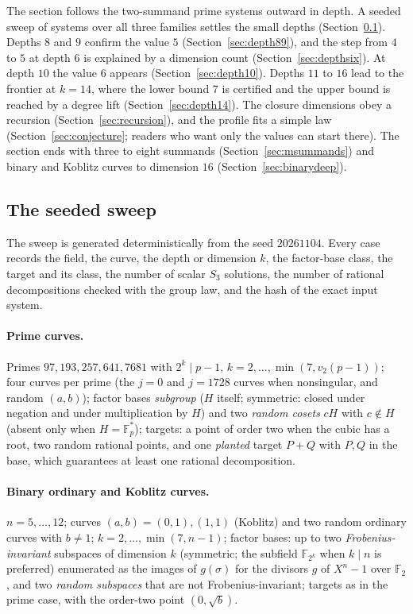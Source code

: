 \documentclass[11pt]{article}
\theoremstyle{definition}\newtheorem{definition}[theorem]{Definition}
\theoremstyle{remark}\newtheorem{remark}[theorem]{Remark}
\newcommand{\F}{\mathbb F}
\begin{document}
The section follows the two-summand prime systems outward in depth. A seeded
sweep of \SWEEPSYSTEMS{} systems over all three families settles the small
depths (Section~\ref{sec:sweep}). Depths $8$ and $9$ confirm the value $5$
(Section~\ref{sec:depth89}), and the step from $4$ to $5$ at depth $6$ is
explained by a dimension count (Section~\ref{sec:depthsix}). At depth $10$
the value $6$ appears (Section~\ref{sec:depth10}). Depths $11$ to $16$ lead
to the frontier at $k=14$, where the lower bound $7$ is certified and the
upper bound is reached by a degree lift (Section~\ref{sec:depth14}). The
closure dimensions obey a recursion (Section~\ref{sec:recursion}), and the
profile fits a simple law (Section~\ref{sec:conjecture}; readers who want
only the values can start there). The section ends with three to eight
summands (Section~\ref{sec:msummands}) and binary and Koblitz curves to
dimension $16$ (Section~\ref{sec:binarydeep}).

\subsection{The seeded sweep}\label{sec:sweep}
The sweep is generated deterministically from the seed $20261104$. Every
case records the field, the curve, the depth or dimension $k$, the
factor-base class, the target and its class, the number of scalar $S_3$
solutions, the number of rational decompositions checked with the group
law, and the hash of the exact input system.

\paragraph{Prime curves.} Primes $97,193,257,641,7681$ with $2^k\mid p-1$,
$k=2,\ldots,\min(7,v_2(p-1))$; four curves per prime (the $j=0$ and
$j=1728$ curves when nonsingular, and random $(a,b)$); factor bases
\emph{subgroup} ($H$ itself; symmetric: closed under negation and under
multiplication by $H$) and two \emph{random cosets} $cH$ with $c\notin H$
(absent only when $H=\F_p^*$); targets: a point of order two when the cubic
has a root, two random rational points, and one \emph{planted} target
$P+Q$ with $P,Q$ in the base, which guarantees at least one rational
decomposition.

\paragraph{Binary ordinary and Koblitz curves.} $n=5,\ldots,12$;
curves $(a,b)=(0,1),(1,1)$ (Koblitz) and two random ordinary curves with
$b\ne1$; $k=2,\ldots,\min(7,n-1)$; factor bases: up to two
\emph{Frobenius-invariant} subspaces of dimension $k$ (symmetric; the
subfield $\F_{2^k}$ when $k\mid n$ is preferred) enumerated as the images
of $g(\sigma)$ for the divisors $g$ of $X^n-1$ over $\F_2$, and two
\emph{random subspaces} that are not Frobenius-invariant; targets as in the
prime case, with the order-two point $(0,\sqrt b)$.
\end{document}
